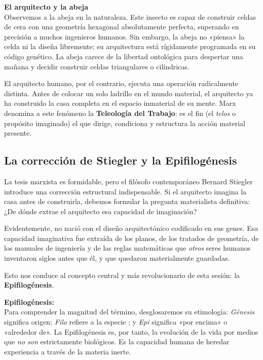 \begin{argumento}
\textbf{El arquitecto y la abeja}\\
Observemos a la abeja en la naturaleza. Este insecto es capaz de construir celdas de cera con una geometría hexagonal absolutamente perfecta, superando en precisión a muchos ingenieros humanos. Sin embargo, la abeja no «piensa» la celda ni la diseña libremente; su arquitectura está rígidamente programada en su código genético. La abeja carece de la libertad ontológica para despertar una mañana y decidir construir celdas triangulares o cilíndricas.

El arquitecto humano, por el contrario, ejecuta una operación radicalmente distinta. Antes de colocar un solo ladrillo en el mundo material, el arquitecto ya ha construido la casa completa en el espacio inmaterial de su mente. Marx denomina a este fenómeno la \textbf{Teleología del Trabajo}: es el fin (el \textit{telos} o propósito imaginado) el que dirige, condiciona y estructura la acción material presente.
\end{argumento}

\subsection{La corrección de Stiegler y la Epifilogénesis}

La tesis marxista es formidable, pero el filósofo contemporáneo Bernard Stiegler introduce una corrección estructural indispensable. Si el arquitecto imagina la casa antes de construirla, debemos formular la pregunta materialista definitiva: ¿De dónde extrae el arquitecto esa capacidad de imaginación? 

Evidentemente, no nació con el diseño arquitectónico codificado en sus genes. Esa capacidad imaginativa fue extraída de los planos, de los tratados de geometría, de los manuales de ingeniería y de las reglas matemáticas que \textit{otros} seres humanos inventaron siglos antes que él, y que quedaron materialmente guardadas. 

Esto nos conduce al concepto central y más revolucionario de esta sesión: la \textbf{Epifilogénesis}. 

\begin{definicion}
\textbf{Epifilogénesis:}\\
Para comprender la magnitud del término, desglosaremos su etimología: \textit{Génesis} significa origen; \textit{Filo} refiere a la especie ; y \textit{Epi} significa «por encima» o «alrededor de». La Epifilogénesis es, por tanto, la evolución de la vida por medios que \textit{no son} estrictamente biológicos. Es la capacidad humana de heredar experiencia a través de la materia inerte.
\end{definicion}

